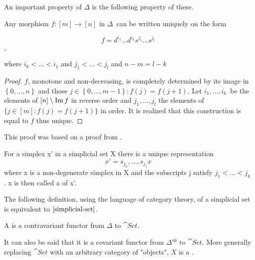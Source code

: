 \documentclass[../../main.tex]{subfiles}
\begin{document}
    An important property of $\Delta$ is the following property of these.

    \begin{proposition}\label{uni-fun}
        Any morphism $f: [m] \to [n]$ in $\Delta$ can be written uniquely on the form

        \begin{equation*}
            f = d^{i_1}...d^{i_k}s^{j_1}...s^{j_l}
        \end{equation*},

        where $i_k < ... < i_1$ and $j_1 < ... < j_l$ and $n - m = l - k$
    \end{proposition}

    \begin{proof}
        $f$, monotone and non-decreasing, is completely determined by its image in $\left\{ 0,...,n \right\}$ and those $j\in \left\{0,...,m-1 \right\}:f(j) = f(j+1)$. Let $i_1, ..., i_k$ be the elements of $[n] \setminus \operatorname{Im} f$ in reverse order and $j_1, ..., j_l$ the elements of $\{j \in [m]: f(j) = f(j+1)\}$ in order. It is realized that this construction is equal to $f$ thus unique.
    \end{proof}

    This proof was based on a proof from \cite{simp-maye}.

    \begin{corollary}\label{uni-sim}
        For a simplex x' in a simplicial set X there is a unique representation
        \[x' = s_{j_h},...,s_{j_1}x\]
        where x is a non-degenerate simplex in X and the subscripts j satisfy $j_1 <... < j_h$. x is then called a  of x'.
    \end{corollary}

    The following definition, using the language of category theory, of a simplicial set is equivalent to $\ref{simplicial-set}$.

    \begin{definition}
        A  is a contravariant functor from $\Delta$ to $\cat{Set}$.
    \end{definition}

    It can also be said that it is a covariant functor from $\Delta^{op}$ to $\cat{Set}$. More generally replacing $\cat{Set}$ with an arbitrary category of "objects", $X$ is a . 
    
\end{document}
